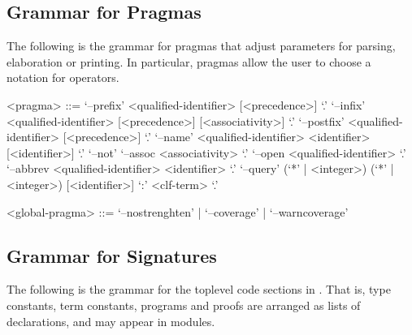 \subsection{Grammar for Pragmas}\label{section:syntax-pragmas}

The following is the grammar for pragmas that adjust parameters for parsing, elaboration or printing.
In particular, pragmas allow the user to choose a notation for operators.

\begin{grammar}
<pragma> ::= `--prefix' <qualified-identifier> [<precedence>] `.'
\alt `--infix' <qualified-identifier> [<precedence>] [<associativity>] `.'
\alt `--postfix' <qualified-identifier> [<precedence>] `.'
\alt `--name' <qualified-identifier> <identifier> [<identifier>] `.'
\alt `--not'
\alt `--assoc <associativity> `.'
\alt `--open <qualified-identifier> `.'
\alt `--abbrev <qualified-identifier> <identifier> `.'
\alt `--query' (`*' | <integer>) (`*' | <integer>) [<identifier>] `:' <clf-term> `.'

<global-pragma> ::= `--nostrenghten' | `--coverage' | `--warncoverage'
\end{grammar}

\subsection{Grammar for \Beluga Signatures}\label{section:syntax-signature}

The following is the grammar for the toplevel code sections in \Beluga.
That is, type constants, term constants, programs and proofs are arranged as lists of declarations, and may appear in modules.

